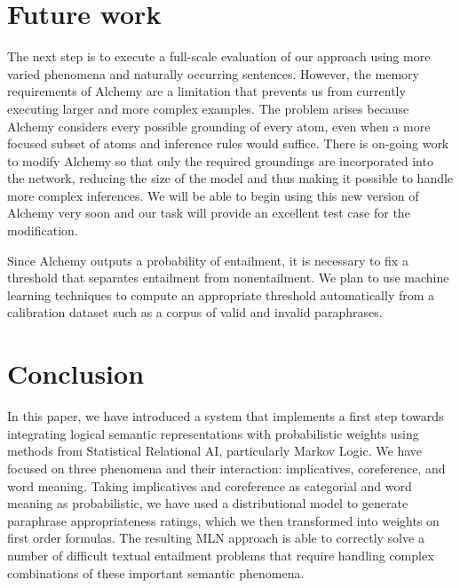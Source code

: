\section{Future work}

The next step is to execute a full-scale evaluation of our approach using 
more varied phenomena and naturally occurring sentences. 
However, the memory requirements of Alchemy are a limitation that prevents us
from currently executing larger and more complex examples.  The problem arises
because Alchemy considers every possible grounding of every atom, even when a
more focused subset of atoms and inference rules would suffice. There is on-going
work to modify Alchemy so that only the required groundings are incorporated
into the network, reducing the size of the model and thus making it possible to
handle more complex inferences.  We will be able to begin using this new version
of Alchemy very soon and our task will provide an excellent test case for the
modification.

Since Alchemy outputs a probability of entailment, it is necessary to fix a
threshold that separates entailment from nonentailment.
We plan to use machine learning techniques to compute an appropriate threshold
automatically from a calibration dataset such as a corpus of valid and invalid
paraphrases.


\section{Conclusion}

In this paper, we have introduced a system that implements a first step
towards integrating logical semantic representations with
probabilistic weights using methods from Statistical Relational AI,
particularly Markov Logic. We have focused on three phenomena and their
interaction: implicatives, coreference, and word meaning. Taking
implicatives and coreference as categorial and word meaning as
probabilistic, we have used a distributional model to generate
paraphrase appropriateness ratings, which we then transformed into
weights on first order formulas.
The resulting MLN approach is able to correctly solve a number of difficult
textual entailment problems that require handling complex combinations of these
important semantic phenomena.

